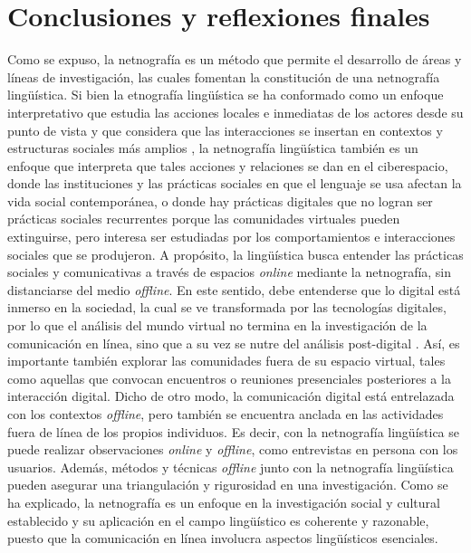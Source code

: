 \section{Conclusiones y reflexiones finales}\label{sec-conclusionesyreflexionesfinales}

Como se expuso, la netnografía es un método que permite el desarrollo de
áreas y líneas de investigación, las cuales fomentan la constitución de
una netnografía lingüística. Si bien la etnografía lingüística se ha
conformado como un enfoque interpretativo que estudia las acciones
locales e inmediatas de los actores desde su punto de vista y que
considera que las interacciones se insertan en contextos y estructuras
sociales más amplios \cite{copland2015linguistic}, la netnografía
lingüística también es un enfoque que interpreta que tales acciones y
relaciones se dan en el ciberespacio, donde las instituciones y las
prácticas sociales en que el lenguaje se usa afectan la vida social
contemporánea, o donde hay prácticas digitales que no logran ser
prácticas sociales recurrentes porque las comunidades virtuales pueden
extinguirse, pero interesa ser estudiadas por los comportamientos e
interacciones sociales que se produjeron. A propósito, la lingüística
busca entender las prácticas sociales y comunicativas a través de
espacios \emph{online} mediante la netnografía, sin distanciarse del
medio \emph{offline}. En este sentido, debe entenderse que lo digital
está inmerso en la sociedad, la cual se ve transformada por las
tecnologías digitales, por lo que el análisis del mundo virtual no
termina en la investigación de la comunicación en línea, sino que a su
vez se nutre del análisis post-digital \cite{berry2015postdigital}. Así, es
importante también explorar las comunidades fuera de su espacio virtual,
tales como aquellas que convocan encuentros o reuniones presenciales
posteriores a la interacción digital. Dicho de otro modo, la
comunicación digital está entrelazada con los contextos \emph{offline},
pero también se encuentra anclada en las actividades fuera de línea de
los propios individuos. Es decir, con la netnografía lingüística se
puede realizar observaciones \emph{online} y \emph{offline}, como
entrevistas en persona con los usuarios. Además, métodos y técnicas
\emph{offline} junto con la netnografía lingüística pueden asegurar una
triangulación y rigurosidad en una investigación. Como se ha explicado,
la netnografía es un enfoque en la investigación social y cultural
establecido y su aplicación en el campo lingüístico es coherente y
razonable, puesto que la comunicación en línea involucra aspectos
lingüísticos esenciales.


